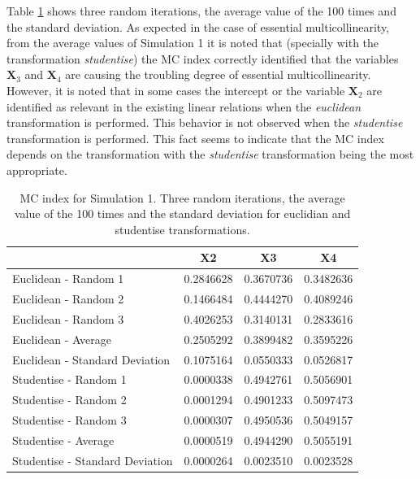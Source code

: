 Table \ref{tab:Simulation1randomlatex} shows three random iterations, the average value of the 100 times and the standard deviation. As expected in the case of essential multicollinearity, from the average values of Simulation 1 it is noted that (specially with the transformation \emph{studentise}) the MC index correctly identified that the variables \(\mathbf{X}_{3}\) and \(\mathbf{X}_{4}\) are causing the troubling degree of essential multicollinearity. However, it is noted that in some cases the intercept or the variable \(\mathbf{X}_{2}\) are identified as relevant in the existing linear relations when the \emph{euclidean} transformation is performed. This behavior is not observed when the \emph{studentise} transformation is performed. This fact seems to indicate that the MC index depends on the transformation with the \emph{studentise} transformation being the most appropriate.

\begin{table}

\caption{\label{tab:Simulation1randomlatex}MC index for Simulation 1. Three random iterations, the average value of the 100 times and the standard deviation for euclidian and studentise transformations.}
\centering
\begin{tabular}[t]{l|c|c|c}
\hline
  & X2 & X3 & X4\\
\hline
Euclidean - Random 1 & 0.2846628 & 0.3670736 & 0.3482636\\
\hline
Euclidean - Random 2 & 0.1466484 & 0.4444270 & 0.4089246\\
\hline
Euclidean - Random 3 & 0.4026253 & 0.3140131 & 0.2833616\\
\hline
Euclidean - Average & 0.2505292 & 0.3899482 & 0.3595226\\
\hline
Euclidean - Standard Deviation & 0.1075164 & 0.0550333 & 0.0526817\\
\hline
Studentise - Random 1 & 0.0000338 & 0.4942761 & 0.5056901\\
\hline
Studentise - Random 2 & 0.0001294 & 0.4901233 & 0.5097473\\
\hline
Studentise - Random 3 & 0.0000307 & 0.4950536 & 0.5049157\\
\hline
Studentise - Average & 0.0000519 & 0.4944290 & 0.5055191\\
\hline
Studentise - Standard Deviation & 0.0000264 & 0.0023510 & 0.0023528\\
\hline
\end{tabular}
\end{table}

